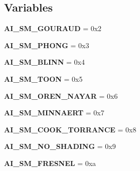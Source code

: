 \subsection*{Variables}
\begin{DoxyCompactItemize}
\item 
\hypertarget{group___shading___type_ga88af0e7cba7590a7ad0e50e1277bc2c4}{
{\bfseries AI\_\-SM\_\-GOURAUD} = 0x2}
\label{group___shading___type_ga88af0e7cba7590a7ad0e50e1277bc2c4}

\item 
\hypertarget{group___shading___type_gaa4809fbbae5721b5f5319cfff612b80c}{
{\bfseries AI\_\-SM\_\-PHONG} = 0x3}
\label{group___shading___type_gaa4809fbbae5721b5f5319cfff612b80c}

\item 
\hypertarget{group___shading___type_ga5d0c2a92b066f20d49c76b89b001b1c7}{
{\bfseries AI\_\-SM\_\-BLINN} = 0x4}
\label{group___shading___type_ga5d0c2a92b066f20d49c76b89b001b1c7}

\item 
\hypertarget{group___shading___type_gaa1ab97eeb5b9f7c698c143bd97c93ff8}{
{\bfseries AI\_\-SM\_\-TOON} = 0x5}
\label{group___shading___type_gaa1ab97eeb5b9f7c698c143bd97c93ff8}

\item 
\hypertarget{group___shading___type_ga55cd6ede79ba35f15902e739c948830a}{
{\bfseries AI\_\-SM\_\-OREN\_\-NAYAR} = 0x6}
\label{group___shading___type_ga55cd6ede79ba35f15902e739c948830a}

\item 
\hypertarget{group___shading___type_gac3044ab3608e9edd5b0854711c58d6a2}{
{\bfseries AI\_\-SM\_\-MINNAERT} = 0x7}
\label{group___shading___type_gac3044ab3608e9edd5b0854711c58d6a2}

\item 
\hypertarget{group___shading___type_ga5f9360de4d4da92167c16589596fe6b7}{
{\bfseries AI\_\-SM\_\-COOK\_\-TORRANCE} = 0x8}
\label{group___shading___type_ga5f9360de4d4da92167c16589596fe6b7}

\item 
\hypertarget{group___shading___type_gaf32b26ca9f39aa8e086cfabf01923a80}{
{\bfseries AI\_\-SM\_\-NO\_\-SHADING} = 0x9}
\label{group___shading___type_gaf32b26ca9f39aa8e086cfabf01923a80}

\item 
\hypertarget{group___shading___type_gab52576c7832c348511c301672924fa31}{
{\bfseries AI\_\-SM\_\-FRESNEL} = 0xa}
\label{group___shading___type_gab52576c7832c348511c301672924fa31}


\end{DoxyCompactItemize}
